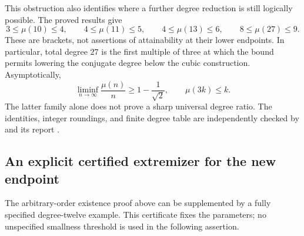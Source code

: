 \documentclass[UTF8,11pt]{ctexart}
\theoremstyle{definition}
\numberwithin{equation}{section}
\begin{document}
This obstruction also identifies where a further degree reduction
is still logically possible. The proved results give
\begin{equation}\label{v31:eq:openminima}
 3\le\mu(10)\le4,\qquad
 4\le\mu(11)\le5,\qquad
 4\le\mu(13)\le6,\qquad
 8\le\mu(27)\le9.
\end{equation}
These are brackets, not assertions of attainability at their lower
endpoints. In particular, total degree $27$ is the first multiple
of three at which the bound permits lowering the conjugate degree
below the cubic construction. Asymptotically,
\[
 \liminf_{n\to\infty}\frac{\mu(n)}n\ge1-\frac1{\sqrt2},
 \qquad \mu(3k)\le k.
\]
The latter family alone does not prove a sharp universal degree
ratio. The identities, integer roundings, and finite degree table
are independently checked by 
and its report .


\subsection{An explicit certified extremizer for the new endpoint}
\label{v17:sec:certificate}

The arbitrary-order existence proof above can be supplemented by
a fully specified degree-twelve example. This certificate fixes
the parameters; no unspecified smallness threshold is used in
the following assertion.
\end{document}
